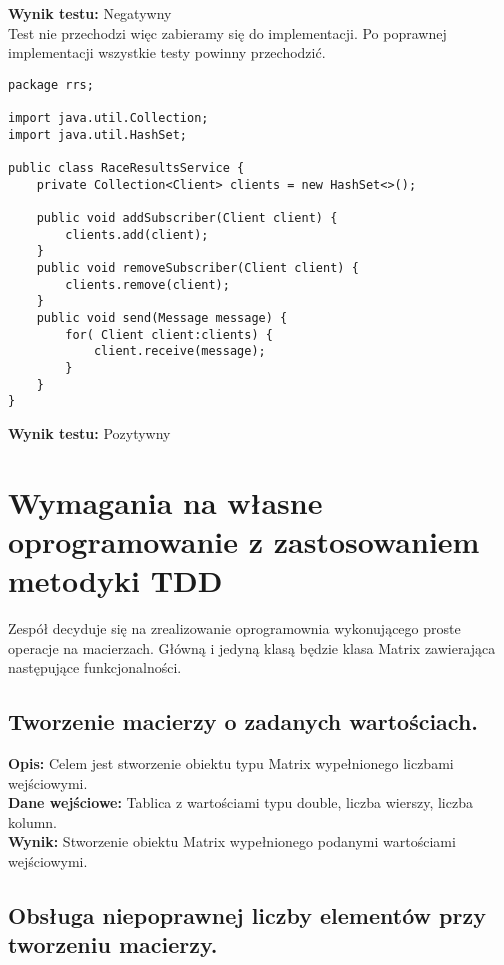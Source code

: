 \documentclass[a4paper,12pt,twoside]{article}
\begin{document}
\noindent
\textbf{Wynik testu: }{\color{red} Negatywny}\\

Test nie przechodzi więc zabieramy się do implementacji. Po poprawnej implementacji wszystkie testy powinny przechodzić.

\begin{lstlisting}
package rrs;

import java.util.Collection;
import java.util.HashSet;

public class RaceResultsService {
    private Collection<Client> clients = new HashSet<>();
    
    public void addSubscriber(Client client) {
        clients.add(client);
    }
    public void removeSubscriber(Client client) {
        clients.remove(client);
    }
    public void send(Message message) {
        for( Client client:clients) {
            client.receive(message);
        }
    }
}
\end{lstlisting}

\noindent
\textbf{Wynik testu: }{\color{green} Pozytywny}

\section{Wymagania na własne oprogramowanie z zastosowaniem metodyki TDD}
\bigskip


Zespół decyduje się na zrealizowanie oprogramownia wykonującego proste operacje na macierzach.
Główną i jedyną klasą będzie klasa Matrix zawierająca następujące funkcjonalności.

\subsection{Tworzenie macierzy o zadanych wartościach.}

\textbf{Opis:} Celem jest stworzenie obiektu typu Matrix wypełnionego liczbami wejściowymi.\\
\textbf{Dane wejściowe:} Tablica z wartościami typu double, liczba wierszy, liczba kolumn.\\
\textbf{Wynik:} Stworzenie obiektu Matrix wypełnionego podanymi wartościami wejściowymi.

\subsection{Obsługa niepoprawnej liczby elementów przy tworzeniu macierzy.}
\end{document}
